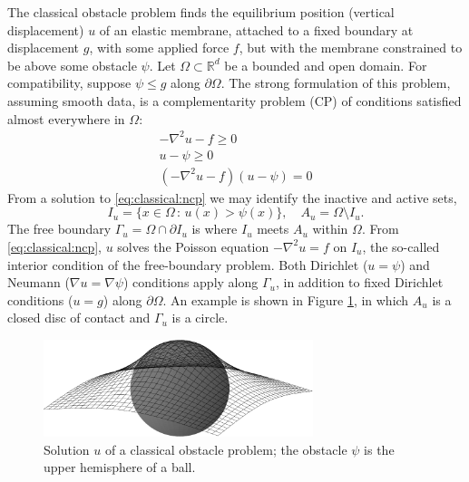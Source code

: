 \documentclass[]{interact}
\theoremstyle{plain}%
\theoremstyle{definition}
\theoremstyle{remark}
\newcommand{\RR}{\mathbb{R}}
\newcommand{\grad}{\nabla}
\begin{document}
The classical obstacle problem \cite{KinderlehrerStampacchia1980} finds the equilibrium position (vertical displacement) $u$ of an elastic membrane, attached to a fixed boundary at displacement $g$, with some applied force $f$, but with the membrane constrained to be above some obstacle $\psi$.  Let $\Omega \subset \RR^d$ be a bounded and open domain.  For compatibility, suppose $\psi \le g$ along $\partial \Omega$.  The strong formulation of this problem, assuming smooth data, is a complementarity problem (CP) of conditions satisfied almost everywhere in $\Omega$:
\begin{subequations} \label{eq:classical:ncp}
\begin{align}
  -\nabla^2 u - f \geq 0 \label{eq:classical:ncp:a} \\
  u - \psi \geq 0\\
  (-\nabla^2u - f)(u - \psi) = 0 \label{eq:classical:ncp:c}
\end{align}
\end{subequations}
From a solution to \eqref{eq:classical:ncp} we may identify the inactive and active sets,
\begin{equation}
  I_u = \{x \in \Omega \,:\, u(x) > \psi(x)\}, \quad A_u = \Omega \setminus I_u. \label{eq:classical:sets}
\end{equation}
The free boundary $\Gamma_u = \Omega \cap \partial I_u$ is where $I_u$ meets $A_u$ within $\Omega$.  From \eqref{eq:classical:ncp}, $u$ solves the Poisson equation $-\nabla^2u = f$ on $I_u$, the so-called interior condition of the free-boundary problem.  Both Dirichlet ($u=\psi$) and Neumann ($\grad u = \grad \psi$) conditions apply along $\Gamma_u$, in addition to fixed Dirichlet conditions ($u=g$) along $\partial\Omega$.  An example is shown in Figure \ref{fig:ball}, in which $A_u$ is a closed disc of contact and $\Gamma_u$ is a circle.

\begin{figure}[H]
\centering
\includegraphics[width=0.7\textwidth]{static/obstacle65.pdf}
\caption{Solution $u$ of a classical obstacle problem; the obstacle $\psi$ is the upper hemisphere of a ball.}
\label{fig:ball}
\end{figure}
\end{document}
